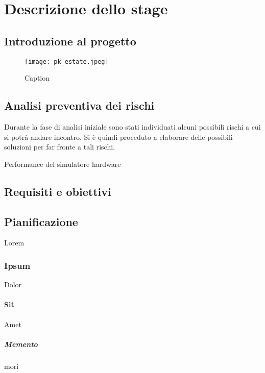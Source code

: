 \chapter{Descrizione dello stage}
\label{chap:descrizione-stage}


\section{Introduzione al progetto}

\begin{figure}[!ht] 
    \centering 
    \texttt{[image: pk\_estate.jpeg]} 
    \caption{Caption}
    \label{fig:pk_estate}
\end{figure}
\lipsum[1]

\section{Analisi preventiva dei rischi}

Durante la fase di analisi iniziale sono stati individuati alcuni possibili rischi a cui si potrà andare incontro.
Si è quindi proceduto a elaborare delle possibili soluzioni per far fronte a tali rischi.

\begin{risk}{Performance del simulatore hardware}
    \label{risk:hardware-simulator} 
\end{risk}

\section{Requisiti e obiettivi}

\section{Pianificazione}
Lorem

\subsection{Ipsum}
Dolor

\subsubsection{Sit}
Amet

\paragraph{Memento}
mori